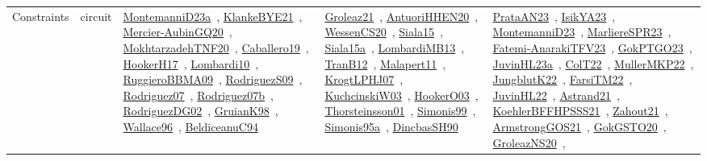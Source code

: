 {\begin{longtable}{lp{3cm}>{\raggedright\arraybackslash}p{6cm}>{\raggedright\arraybackslash}p{6cm}>{\raggedright\arraybackslash}p{8cm}}
Constraints & circuit & \href{../works/MontemanniD23a.pdf}{MontemanniD23a}~\cite{MontemanniD23a}, \href{../works/KlankeBYE21.pdf}{KlankeBYE21}~\cite{KlankeBYE21}, \href{../works/Mercier-AubinGQ20.pdf}{Mercier-AubinGQ20}~\cite{Mercier-AubinGQ20}, \href{../works/MokhtarzadehTNF20.pdf}{MokhtarzadehTNF20}~\cite{MokhtarzadehTNF20}, \href{../works/Caballero19.pdf}{Caballero19}~\cite{Caballero19}, \href{../works/HookerH17.pdf}{HookerH17}~\cite{HookerH17}, \href{../works/Lombardi10.pdf}{Lombardi10}~\cite{Lombardi10}, \href{../works/RuggieroBBMA09.pdf}{RuggieroBBMA09}~\cite{RuggieroBBMA09}, \href{../works/RodriguezS09.pdf}{RodriguezS09}~\cite{RodriguezS09}, \href{../works/Rodriguez07.pdf}{Rodriguez07}~\cite{Rodriguez07}, \href{../works/Rodriguez07b.pdf}{Rodriguez07b}~\cite{Rodriguez07b}, \href{../works/RodriguezDG02.pdf}{RodriguezDG02}~\cite{RodriguezDG02}, \href{../works/GruianK98.pdf}{GruianK98}~\cite{GruianK98}, \href{../works/Wallace96.pdf}{Wallace96}~\cite{Wallace96}, \href{../works/BeldiceanuC94.pdf}{BeldiceanuC94}~\cite{BeldiceanuC94} & \href{../works/Groleaz21.pdf}{Groleaz21}~\cite{Groleaz21}, \href{../works/AntuoriHHEN20.pdf}{AntuoriHHEN20}~\cite{AntuoriHHEN20}, \href{../works/WessenCS20.pdf}{WessenCS20}~\cite{WessenCS20}, \href{../works/Siala15.pdf}{Siala15}~\cite{Siala15}, \href{../works/Siala15a.pdf}{Siala15a}~\cite{Siala15a}, \href{../works/LombardiMB13.pdf}{LombardiMB13}~\cite{LombardiMB13}, \href{../works/TranB12.pdf}{TranB12}~\cite{TranB12}, \href{../works/Malapert11.pdf}{Malapert11}~\cite{Malapert11}, \href{../works/KrogtLPHJ07.pdf}{KrogtLPHJ07}~\cite{KrogtLPHJ07}, \href{../works/KuchcinskiW03.pdf}{KuchcinskiW03}~\cite{KuchcinskiW03}, \href{../works/HookerO03.pdf}{HookerO03}~\cite{HookerO03}, \href{../works/Thorsteinsson01.pdf}{Thorsteinsson01}~\cite{Thorsteinsson01}, \href{../works/Simonis99.pdf}{Simonis99}~\cite{Simonis99}, \href{../works/Simonis95a.pdf}{Simonis95a}~\cite{Simonis95a}, \href{../works/DincbasSH90.pdf}{DincbasSH90}~\cite{DincbasSH90} & \href{../works/PrataAN23.pdf}{PrataAN23}~\cite{PrataAN23}, \href{../works/IsikYA23.pdf}{IsikYA23}~\cite{IsikYA23}, \href{../works/MontemanniD23.pdf}{MontemanniD23}~\cite{MontemanniD23}, \href{../works/MarliereSPR23.pdf}{MarliereSPR23}~\cite{MarliereSPR23}, \href{../works/Fatemi-AnarakiTFV23.pdf}{Fatemi-AnarakiTFV23}~\cite{Fatemi-AnarakiTFV23}, \href{../works/GokPTGO23.pdf}{GokPTGO23}~\cite{GokPTGO23}, \href{../works/JuvinHL23a.pdf}{JuvinHL23a}~\cite{JuvinHL23a}, \href{../works/ColT22.pdf}{ColT22}~\cite{ColT22}, \href{../works/MullerMKP22.pdf}{MullerMKP22}~\cite{MullerMKP22}, \href{../works/JungblutK22.pdf}{JungblutK22}~\cite{JungblutK22}, \href{../works/FarsiTM22.pdf}{FarsiTM22}~\cite{FarsiTM22}, \href{../works/JuvinHL22.pdf}{JuvinHL22}~\cite{JuvinHL22}, \href{../works/Astrand21.pdf}{Astrand21}~\cite{Astrand21}, \href{../works/KoehlerBFFHPSSS21.pdf}{KoehlerBFFHPSSS21}~\cite{KoehlerBFFHPSSS21}, \href{../works/Zahout21.pdf}{Zahout21}~\cite{Zahout21}, \href{../works/ArmstrongGOS21.pdf}{ArmstrongGOS21}~\cite{ArmstrongGOS21}, \href{../works/GokGSTO20.pdf}{GokGSTO20}~\cite{GokGSTO20}, \href{../works/GroleazNS20.pdf}{GroleazNS20}~\cite{GroleazNS20}, 
\end{longtable}}
